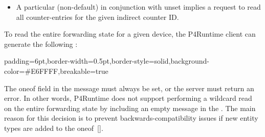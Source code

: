 \documentclass[11pt]{article}
\begin{document}
{\begin{itemize}[noitemsep,topsep=\mdcompacttopsep]
\item{}A particular (non-default)  in conjunction with  unset
implies a request to read all counter-entries for the given indirect counter
ID.%
\end{itemize}%

\noindent{}To read the entire forwarding state for a given device, the P4Runtime client can
generate the following :%

\begin{mdbmargintb}{6pt}{6pt}%
\begin{mdblock}{padding=6pt,border-width=0.5pt,border-style=solid,background-color=\#E6FFFF,breakable=true}%
\begin{mdpre}%
\end{mdpre}%
\end{mdblock}%
\end{mdbmargintb}%

\noindent{}The  oneof field in the  message must always be set, or the
server must return an  error. In other words, P4Runtime does
not support performing a wildcard read on the entire forwarding state by
including an empty  message in the . The main reason for
this decision is to prevent backwards-compatibility issues if new entity types
are added to the  oneof~[].%

}
\end{document}
